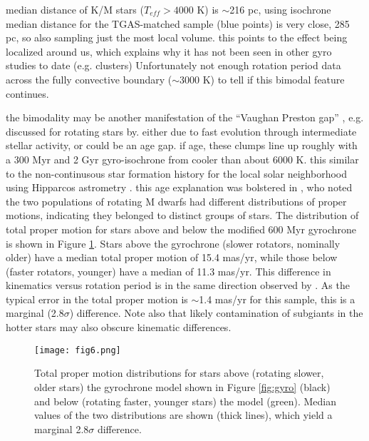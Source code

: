 \documentclass[manuscript, letterpaper]{aastex6}
\begin{document}
median distance of K/M stars ($T_{eff} > 4000$ K) is $\sim$216 pc, using isochrone
median distance for the TGAS-matched sample (blue points) is very close, 285 pc, so also sampling just the most local volume.
this points to the effect being localized around us, which explains why it has not been seen in other gyro studies to date (e.g. clusters)
Unfortunately not enough rotation period data across the fully convective boundary ($\sim$3000 K) to tell if this bimodal feature continues.



the bimodality may be another manifestation of the ``Vaughan Preston gap'' \citep{vaughan1980}, e.g. discussed for rotating stars by\citet{kado-fong2016}.
either due to fast evolution through intermediate stellar activity, or could be an age gap. if age, these clumps line up roughly with a 300 Myr and 2 Gyr \citet{meibom2011} gyro-isochrone from cooler than about 6000 K. this similar to the non-continusous star formation history for the local solar neighborhood using Hipparcos astrometry \citep{hernandez2000}. this age explanation was bolstered in \citet{mcquillan2013}, who noted the two populations of rotating M dwarfs had different distributions of proper motions, indicating they belonged to distinct groups of stars. The distribution of total proper motion for stars above and below the modified 600 Myr gyrochrone is shown in Figure \ref{fig:pm}. Stars above the gyrochrone (slower rotators, nominally older) have a median total proper motion of 15.4 mas/yr, while those below (faster rotators, younger)  have a median of 11.3 mas/yr. This difference in kinematics versus rotation period is in the same direction observed by \citet{mcquillan2013}. As the typical error in the total proper motion is $\sim$1.4 mas/yr for this sample, this is a marginal (2.8$\sigma$) difference. Note also that likely contamination of subgiants in the hotter stars may also obscure kinematic differences.

\begin{figure}[]
\centering
\texttt{[image: fig6.png]}
\caption{Total proper motion distributions for stars above (rotating slower, older stars) the gyrochrone model shown in Figure \ref{fig:gyro} (black) and below (rotating faster, younger stars) the model (green). Median values of the two distributions are shown (thick lines), which yield a marginal 2.8$\sigma$ difference.
}
\label{fig:pm}
\end{figure}
\end{document}
